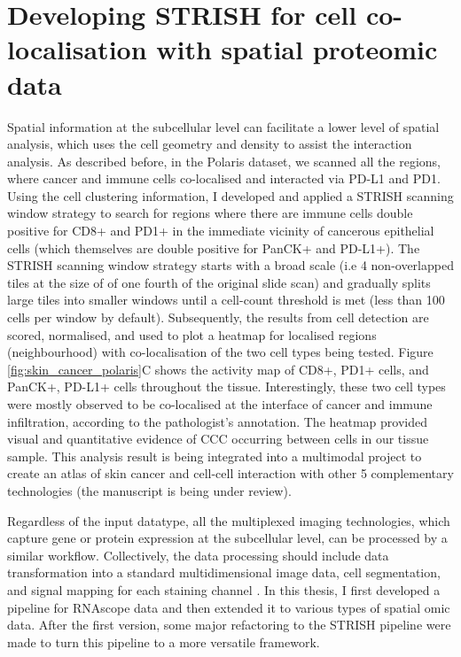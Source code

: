 \section{Developing STRISH for cell co-localisation with spatial proteomic data}
\label{Sec:3.Cell_colocalisation_PD1_PDL1}	%
Spatial information at the subcellular level can facilitate a lower level of spatial analysis, which uses the cell geometry and density to assist the interaction analysis. As described before, in the Polaris dataset, we scanned all the regions, where cancer and immune cells co-localised and interacted via PD-L1 and PD1. Using the cell clustering information, I developed and applied a STRISH scanning window strategy to search for regions where there are immune cells double positive for CD8+ and PD1+ in the immediate vicinity of cancerous epithelial cells (which themselves are double positive for PanCK+ and PD-L1+). The STRISH scanning window strategy starts with a broad scale (i.e 4 non-overlapped tiles at the size of of one fourth of the original slide scan) and gradually splits large tiles into smaller windows until a cell-count threshold is met (less than 100 cells per window by default). Subsequently, the results from cell detection are scored, normalised, and used to plot a heatmap for localised regions (neighbourhood) with co-localisation of the two cell types being tested. Figure \ref{fig:skin_cancer_polaris}C shows the activity map of CD8+, PD1+ cells, and PanCK+, PD-L1+ cells throughout the tissue. Interestingly, these two cell types were mostly observed to be co-localised at the interface of cancer and immune infiltration, according to the pathologist's annotation. The heatmap provided visual and quantitative evidence of CCC occurring between cells in our tissue sample. This analysis result is being integrated into a multimodal project to create an atlas of skin cancer and cell-cell interaction with other 5 complementary technologies (the manuscript is being under review).

Regardless of the input datatype, all the multiplexed imaging technologies, which capture gene or protein expression at the subcellular level, can be processed by a similar workflow. Collectively, the data processing should include data transformation into a standard multidimensional image data, cell segmentation, and signal mapping for each staining channel \cite{shakya2020immune, liu2019comparison, aghaeepour2013critical}. In this thesis, I first developed a pipeline for RNAscope data and then extended it to various types of spatial omic data. After the first version, some major refactoring to the STRISH pipeline were made to turn this pipeline to a more versatile framework. 

